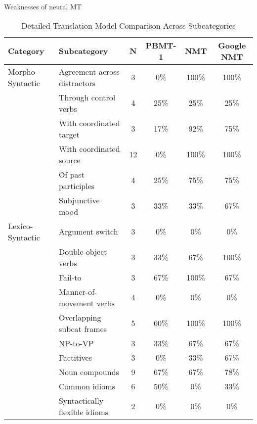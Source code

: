 \documentclass{beamer}
\begin{document}
\begin{frame}{Weaknesses of neural MT}

  {\tiny %
  \begin{table}[htbp]
    \centering
    \caption{Detailed Translation Model Comparison Across Subcategories}
    \label{tab:detailed_translation_model_comparison}
    \begin{tabularx}{\textwidth}{XXcccc}
      \toprule
      Category & Subcategory & N & PBMT-1 & NMT & Google NMT \\
      \midrule
      Morpho-Syntactic & Agreement across distractors & 3 & 0\% & 100\% & 100\% \\
      & Through control verbs & 4 & 25\% & 25\% & 25\% \\
      & With coordinated target & 3 & 17\% & 92\% & 75\% \\
      & With coordinated source & 12 & 0\% & 100\% & 100\% \\
      & Of past participles & 4 & 25\% & 75\% & 75\% \\
      & Subjunctive mood & 3 & 33\% & 33\% & 67\% \\
      \midrule
      Lexico-Syntactic & Argument switch & 3 & 0\% & 0\% & 0\% \\
      & Double-object verbs & 3 & 33\% & 67\% & 100\% \\
      & Fail-to & 3 & 67\% & 100\% & 67\% \\
      & Manner-of-movement verbs & 4 & 0\% & 0\% & 0\% \\
      & Overlapping subcat frames & 5 & 60\% & 100\% & 100\% \\
      & NP-to-VP & 3 & 33\% & 67\% & 67\% \\
      & Factitives & 3 & 0\% & 33\% & 67\% \\
      & Noun compounds & 9 & 67\% & 67\% & 78\% \\
      & Common idioms & 6 & 50\% & 0\% & 33\% \\
      & Syntactically flexible idioms & 2 & 0\% & 0\% & 0\% \\
      \bottomrule
    \end{tabularx}
  \end{table}
  }

\end{frame}
\end{document}
